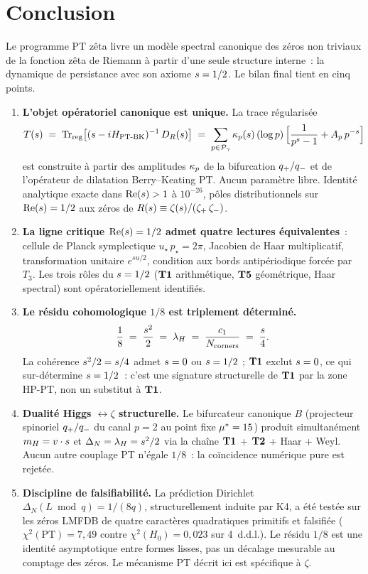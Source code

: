\section{Conclusion}
\label{sec:conclusion}

Le programme PT zêta livre un modèle spectral canonique des zéros non
triviaux de la fonction zêta de Riemann à partir d'une seule structure
interne~: la dynamique de persistance avec son axiome $s = 1/2$. Le
bilan final tient en cinq points.

\begin{enumerate}[leftmargin=*]
\item \textbf{L'objet opératoriel canonique est unique.} La trace
régularisée
\[
T(s) \;=\; \operatorname{Tr}_{\mathrm{reg}}\!\big[(s - iH_{\mathrm{PT\text{-}BK}})^{-1}\,D_R(s)\big]
\;=\; \sum_{p \in \mathcal{P}_\gamma} \kappa_p(s)\,(\log p)\,\Big[\frac{1}{p^s - 1} + A_p\,p^{-s}\Big]
\]
est construite à partir des amplitudes $\kappa_p$ de la bifurcation
$q_{+}/q_{-}$ et de l'opérateur de dilatation Berry--Keating PT.
Aucun paramètre libre. Identité analytique exacte dans $\operatorname{Re}(s) > 1$ à
$10^{-26}$, pôles distributionnels sur $\operatorname{Re}(s) = 1/2$ aux zéros de
$R(s) \equiv \zeta(s) / (\zeta_{+}\,\zeta_{-})$.

\item \textbf{La ligne critique $\operatorname{Re}(s) = 1/2$ admet quatre lectures
équivalentes}~: cellule de Planck symplectique
$u_\star\,p_\star = 2\pi$, Jacobien de Haar multiplicatif,
transformation unitaire $e^{su/2}$, condition aux bords antipériodique
forcée par $T_3$. Les trois rôles du $s = 1/2$ ($\textbf{T1}$
arithmétique, $\textbf{T5}$ géométrique, Haar spectral) sont
opératoriellement identifiés.

\item \textbf{Le résidu cohomologique $1/8$ est triplement déterminé.}
\[
\dfrac{1}{8} \;=\; \dfrac{s^{2}}{2} \;=\; \lambda_H
\;=\; \dfrac{c_1}{N_{\mathrm{corners}}} \;=\; \dfrac{s}{4}.
\]
La cohérence $s^{2}/2 = s/4$ admet $s = 0$ ou $s = 1/2$ ;
$\textbf{T1}$ exclut $s = 0$, ce qui sur-détermine $s = 1/2$~: c'est
une signature structurelle de $\textbf{T1}$ par la zone HP-PT, non un
substitut à $\textbf{T1}$.

\item \textbf{Dualité Higgs $\leftrightarrow \zeta$ structurelle.} Le
bifurcateur canonique $B$ (projecteur spinoriel $q_{+}/q_{-}$ du
canal $p = 2$ au point fixe $\mu^{*} = 15$) produit simultanément
$m_H = v \cdot s$ et
$\Delta_N = \lambda_H = s^{2}/2$ via la chaîne
$\textbf{T1}$ + $\textbf{T2}$ + Haar + Weyl. Aucun autre couplage PT n'égale
$1/8$~: la coïncidence numérique pure est rejetée.

\item \textbf{Discipline de falsifiabilité.} La prédiction Dirichlet
$\Delta_N(L \bmod q) = 1/(8q)$, structurellement induite par K4, a été
testée sur les zéros LMFDB de quatre caractères quadratiques primitifs
et falsifiée ($\chi^{2}(\mathrm{PT}) = 7{,}49$ contre
$\chi^{2}(H_0) = 0{,}023$ sur 4~d.d.l.). Le résidu $1/8$ est une
identité asymptotique entre formes lisses, pas un décalage mesurable au
comptage des zéros. Le mécanisme PT décrit ici est spécifique à
$\zeta$.
\end{enumerate}

